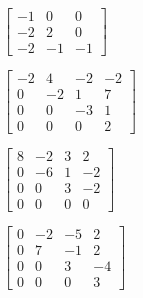 \begin{exercise}
\begin{Parts}
\begin{reduce}
\item \(\begin{bmatrix} -1 & 0 & 0
\\-2 & 2 & 0
\\-2 & -1 & -1 \end{bmatrix}\)

\item \(\begin{bmatrix} -2 & 4 & -2 & -2
\\0 & -2 & 1 & 7
\\0 & 0 & -3 & 1
\\0 & 0 & 0 & 2 \end{bmatrix}\)
\end{reduce}

\item \(\begin{bmatrix} 8 & -2 & 3 & 2
\\0 & -6 & 1 & -2
\\0 & 0 & 3 & -2
\\0 & 0 & 0 & 0 \end{bmatrix}\)

\item \(\begin{bmatrix} 0 & -2 & -5 & 2
\\0 & 7 & -1 & 2
\\0 & 0 & 3 & -4
\\0 & 0 & 0 & 3 \end{bmatrix}\)

\end{Parts}
\end{exercise}








\endinput
